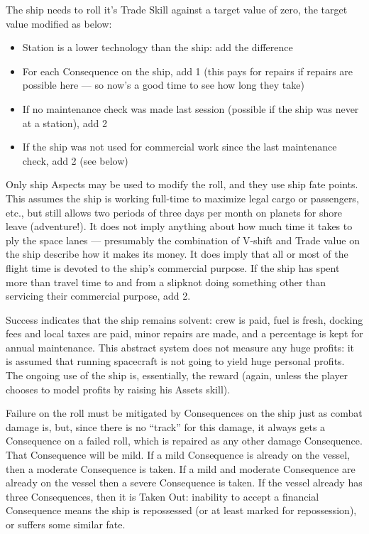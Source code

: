 The ship needs to roll it's Trade Skill against a target value of zero, the target value modified as below:

\begin{itemize}
\item Station is a lower technology than the ship: add the difference

\item For each Consequence on the ship, add 1 (this pays for repairs if repairs are possible here --- so now's a good time to see how long they take)

\item If no maintenance check was made last session (possible if the ship was never at a station), add 2

\item If the ship was not used for commercial work since the last maintenance check, add 2 (see below)
\end{itemize}


Only ship Aspects may be used to modify the roll, and they use ship fate points. This assumes the ship is working full-time to maximize legal cargo or passengers, etc., but still allows two periods of three days per month on planets for shore leave (adventure!). It does not imply anything about how much time it takes to ply the space lanes --- presumably the combination of V-shift and Trade value on the ship describe how it makes its money. It does imply that all or most of the flight time is devoted to the ship's commercial purpose. If the ship has spent more than travel time to and from a slipknot doing something other than servicing their commercial purpose, add 2.

Success indicates that the ship remains solvent: crew is paid, fuel is fresh, docking fees and local taxes are paid, minor repairs are made, and a percentage is kept for annual maintenance. This abstract system does not measure any huge profits: it is assumed that running spacecraft is not going to yield huge personal profits. The ongoing use of the ship is, essentially, the reward (again, unless the player chooses to model profits by raising his Assets skill).


Failure on the roll must be mitigated by Consequences on the ship just as combat damage is, but, since there is no ``track'' for this damage, it always gets a Consequence on a failed roll, which is repaired as any other damage Consequence. That Consequence will be mild. If a mild Consequence is already on the vessel, then a moderate Consequence is taken. If a mild and moderate Consequence are already on the vessel then a severe Consequence is taken. If the vessel already has three Consequences, then it is Taken Out: inability to accept a financial Consequence means the ship is repossessed (or at least marked for repossession), or suffers some similar fate.

